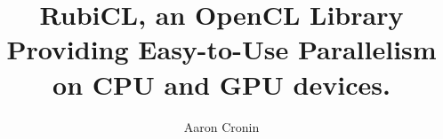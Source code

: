 \title{RubiCL, an OpenCL Library Providing Easy-to-Use Parallelism on CPU and GPU devices.}

\author{Aaron Cronin}


